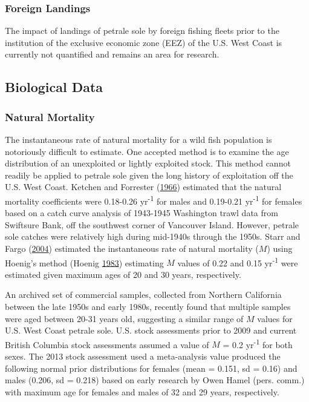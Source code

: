 \documentclass[12pt,]{article}
\begin{document}
\subsubsection{Foreign Landings}\label{foreign-landings}

The impact of landings of petrale sole by foreign fishing fleets prior
to the institution of the exclusive economic zone (EEZ) of the U.S. West
Coast is currently not quantified and remains an area for research.

\subsection{Biological Data}\label{biological-data}

\subsubsection{Natural Mortality}\label{natural-mortality}

The instantaneous rate of natural mortality for a wild fish population
is notoriously difficult to estimate. One accepted method is to examine
the age distribution of an unexploited or lightly exploited stock. This
method cannot readily be applied to petrale sole given the long history
of exploitation off the U.S. West Coast. Ketchen and Forrester
(\protect\hyperlink{ref-ketchen_population_1966}{1966}) estimated that
the natural mortality coefficients were 0.18-0.26 yr\textsuperscript{-1}
for males and 0.19-0.21 yr\textsuperscript{-1} for females based on a
catch curve analysis of 1943-1945 Washington trawl data from Swiftsure
Bank, off the southwest corner of Vancouver Island. However, petrale
sole catches were relatively high during mid-1940s through the 1950s.
Starr and Fargo (\protect\hyperlink{ref-starr_petrale_2004}{2004})
estimated the instantaneous rate of natural mortality (\(M\)) using
Hoenig's method (Hoenig
\protect\hyperlink{ref-hoenig_empirical_1983}{1983}) estimating \(M\)
values of 0.22 and 0.15 yr\textsuperscript{-1} were estimated given
maximum ages of 20 and 30 years, respectively.

An archived set of commercial samples, collected from Northern
California between the late 1950s and early 1980s, recently found that
multiple samples were aged between 20-31 years old, suggesting a similar
range of \(M\) values for U.S. West Coast petrale sole. U.S. stock
assessments prior to 2009 and current British Columbia stock assessments
assumed a value of \(M\) = 0.2 yr\textsuperscript{-1} for both sexes.
The 2013 stock assessment used a meta-analysis value produced the
following normal prior distributions for females (mean = 0.151, sd =
0.16) and males (0.206, sd = 0.218) based on early research by Owen
Hamel (pers. comm.) with maximum age for females and males of 32 and 29
years, respectively.
\end{document}
